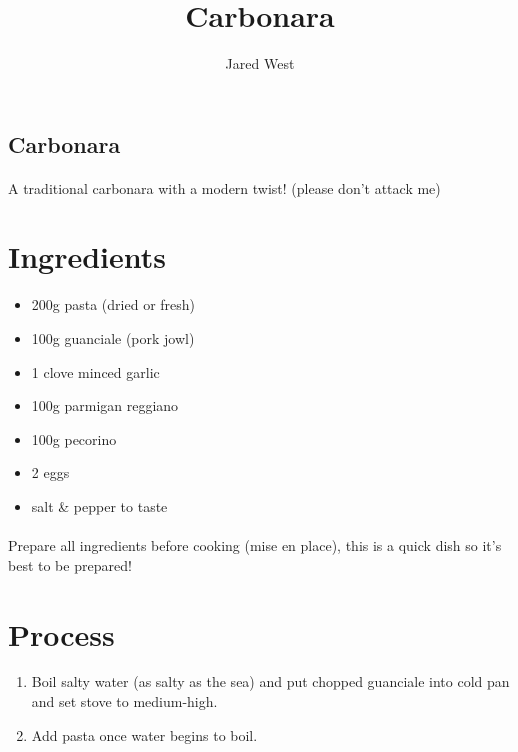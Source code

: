 \documentclass[12pt]{article}
\title{Carbonara}
\author{Jared West}
\begin{document}


\begin{center}
    \section*{\huge{Carbonara}}
    \paragraph{}
    A traditional carbonara with a modern twist! (please don't attack me)
\end{center}

\section*{Ingredients}

\begin{itemize}
    \item 200g pasta (dried or fresh)
    \item 100g guanciale (pork jowl)
    \item 1 clove minced garlic
    \item 100g parmigan reggiano
    \item 100g pecorino
    \item 2 eggs
    \item salt \& pepper to taste
\end{itemize}

\paragraph{}
    Prepare all ingredients before cooking (mise en place), this is a quick dish so it's best to be prepared!

\section*{Process}

\begin{enumerate}
    \item Boil salty water (as salty as the sea) and put chopped guanciale into cold pan and set stove to medium-high.
    \item Add pasta once water begins to boil.
\end{enumerate}
\end{document}
